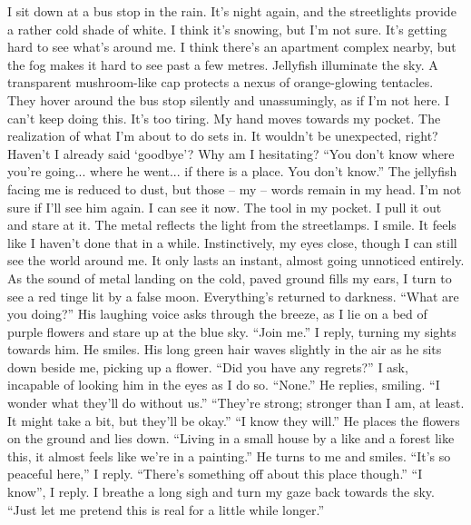 \documentclass[a4paper, 12pt]{book}
\newcommand\tab[1][1cm]{\hspace*{#1}}
\begin{document}
\newline
\tab
I sit down at a bus stop in the rain. It’s night again, and the streetlights provide a rather cold shade of white. I think it’s snowing, but I’m not sure. It’s getting hard to see what’s around me. I think there’s an apartment complex nearby, but the fog makes it hard to see past a few metres. Jellyfish illuminate the sky. A transparent mushroom-like cap protects a nexus of orange-glowing tentacles. They hover around the bus stop silently and unassumingly, as if I’m not here.
\newline
\tab
I can’t keep doing this. It’s too tiring. My hand moves towards my pocket. The realization of what I’m about to do sets in. It wouldn’t be unexpected, right? Haven’t I already said ‘goodbye’? Why am I hesitating? ``You don’t know where you’re going... where he went... if there is a place. You don’t know.'' The jellyfish facing me is reduced to dust, but those -- my -- words remain in my head. I’m not sure if I’ll see him again.
\newline
\tab
I can see it now. The tool in my pocket. I pull it out and stare at it. The metal reflects the light from the streetlamps. I smile. It feels like I haven’t done that in a while. Instinctively, my eyes close, though I can still see the world around me. It only lasts an instant, almost going unnoticed entirely. As the sound of metal landing on the cold, paved ground fills my ears, I turn to see a red tinge lit by a false moon. Everything’s returned to darkness.
\newline
\tab
``What are you doing?'' His laughing voice asks through the breeze, as I lie on a bed of purple flowers and stare up at the blue sky.
\newline
\tab
``Join me.'' I reply, turning my sights towards him. He smiles. His long green hair waves slightly in the air as he sits down beside me, picking up a flower. ``Did you have any regrets?'' I ask, incapable of looking him in the eyes as I do so.
\newline
\tab
``None.'' He replies, smiling. ``I wonder what they’ll do without us.''
\newline
\tab
``They’re strong; stronger than I am, at least. It might take a bit, but they’ll be okay.''
\newline
\tab
``I know they will.'' He places the flowers on the ground and lies down. ``Living in a small house by a like and a forest like this, it almost feels like we’re in a painting.'' He turns to me and smiles.
\newline
\tab
``It’s so peaceful here,'' I reply.
\newline
\tab
``There’s something off about this place though.''
\newline
\tab
``I know'', I reply. I breathe a long sigh and turn my gaze back towards the sky. ``Just let me pretend this is real for a little while longer.''
\end{document}
